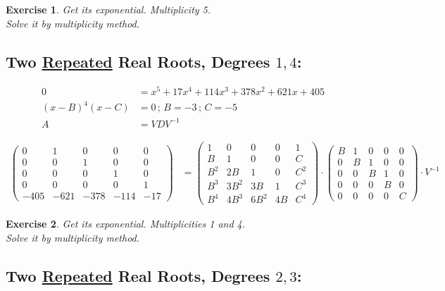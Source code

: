 \documentclass[12pt,a4paper]{article}
\newtheorem{exercise}{Exercise}[section]
\begin{document}
\begin{exercise}
Get its exponential. Multiplicity 5. \\
Solve it by multiplicity method.
\end{exercise}

\subsection{Two \href{}{Repeated} Real Roots, Degrees $1, 4$:}

\begin{align}
0 &= x^5 + 17 x^4 + 114 x^3 + 378 x^2 + 621x + 405 \\
(x - B)^4 (x - C) &= 0\,;\,B = -3\,;\,C = -5  \\
A &= VDV^{-1}
\end{align}

\begin{align}
\left( \begin{matrix} 0&1&0&0&0 \\ 0&0&1&0&0 \\ 0&0&0&1&0 \\ 0&0&0&0&1 \\ -405 & -621 & -378 & -114 & -17 \end{matrix} \right)
&=
\left( \begin{matrix} 1&0&0&0&1 \\ B&1&0&0&C \\ B^2&2B&1&0&C^2 \\ B^3&3B^2&3B&1&C^3 \\ B^4&4B^3&6B^2&4B&C^4 \end{matrix} \right) \cdot
\left( \begin{matrix} B & 1&0&0&0 \\ 0 & B&1&0&0 \\ 0 & 0 & B & 1 & 0 \\ 0 & 0 & 0 & B & 0 \\ 0 & 0 & 0 & 0 & C \end{matrix} \right) \cdot V^{-1}
\end{align}

\begin{exercise}
Get its exponential. Multiplicities 1 and 4. \\
Solve it by multiplicity method.
\end{exercise}

\subsection{Two \href{}{Repeated} Real Roots, Degrees $2, 3$:}
\end{document}
